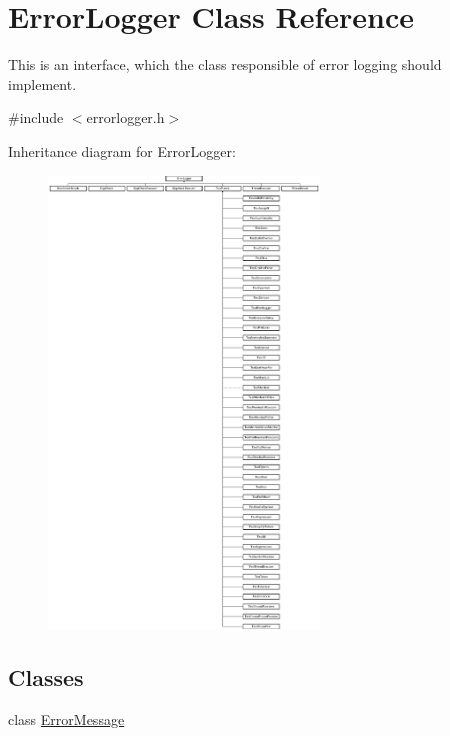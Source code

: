 \hypertarget{class_error_logger}{\section{Error\-Logger Class Reference}
\label{class_error_logger}
}


This is an interface, which the class responsible of error logging should implement.  




{\ttfamily \#include $<$errorlogger.\-h$>$}

Inheritance diagram for Error\-Logger\-:\begin{figure}[H]
\begin{center}
\leavevmode
\includegraphics[height=12.000000cm]{class_error_logger}
\end{center}
\end{figure}
\subsection*{Classes}
\begin{DoxyCompactItemize}
\item 
class \hyperlink{class_error_logger_1_1_error_message}{Error\-Message}
\end{DoxyCompactItemize}
